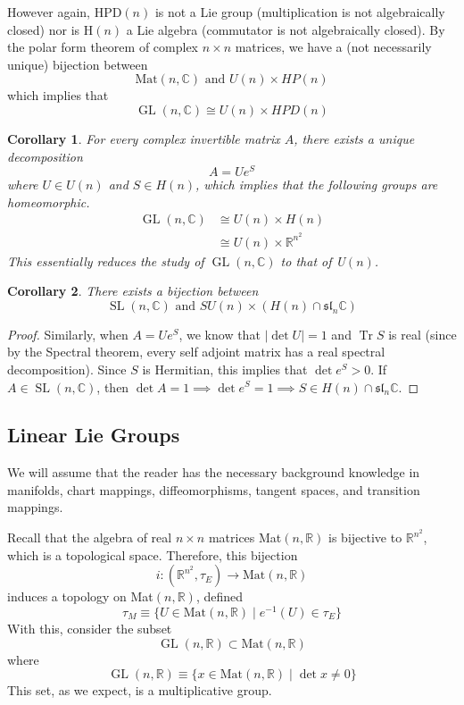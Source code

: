 \documentclass{article}
\DeclareMathOperator{\Tr}{Tr}
\DeclareMathOperator{\GL}{GL}
\DeclareMathOperator{\SL}{SL}
\newtheorem{corollary}{Corollary}[theorem]
\theoremstyle{remark}
\theoremstyle{definition}
\begin{document}
However again, HPD$(n)$ is not a Lie group (multiplication is not algebraically closed) nor is H$(n)$ a Lie algebra (commutator is not algebraically closed). By the polar form theorem of complex $n \times n$ matrices, we have a (not necessarily unique) bijection between
\[\text{Mat}(n, \mathbb{C}) \text{ and } U(n) \times HP(n)\]
which implies that
\[\GL(n, \mathbb{C}) \cong U(n) \times HPD (n)\]
\begin{corollary}
For every complex invertible matrix $A$, there exists a unique decomposition
\[A = U e^S \]
where $U \in U(n)$ and $S \in H(n)$, which implies that the following groups are homeomorphic. 
\begin{align*}
    \GL(n, \mathbb{C}) & \cong U(n) \times H(n) \\
    & \cong U(n) \times \mathbb{R}^{n^2}
\end{align*} 
This essentially reduces the study of $\GL(n, \mathbb{C})$ to that of U$(n)$. 
\end{corollary}

\begin{corollary}
There exists a bijection between 
\[\SL(n, \mathbb{C}) \text{ and } SU(n) \times (H(n) \cap \mathfrak{sl}_n \mathbb{C})\]
\end{corollary}
\begin{proof}
Similarly, when $A = U e^S$, we know that $|\det{U}| = 1$ and $\Tr{S}$ is real (since by the Spectral theorem, every self adjoint matrix has a real spectral decomposition). Since $S$ is Hermitian, this implies that $\det{e^S} > 0$. If $A \in \SL(n, \mathbb{C})$, then $\det{A} = 1 \implies \det{e^S} = 1 \implies S \in H(n) \cap \mathfrak{sl}_n \mathbb{C}$. 
\end{proof}

\subsection{Linear Lie Groups}
We will assume that the reader has the necessary background knowledge in manifolds, chart mappings, diffeomorphisms, tangent spaces, and transition mappings. 

Recall that the algebra of real $n \times n$ matrices Mat$(n, \mathbb{R})$ is bijective to $\mathbb{R}^{n^2}$, which is a topological space. Therefore, this bijection 
\[i:(\mathbb{R}^{n^2}, \tau_E) \longrightarrow \text{Mat}(n, \mathbb{R})\]
induces a topology on Mat$(n, \mathbb{R})$, defined 
\[\tau_M \equiv \{U \in \text{Mat}(n, \mathbb{R}) \; | \; e^{-1} (U) \in \tau_E\}\]
With this, consider the subset
\[\GL(n, \mathbb{R}) \subset \text{Mat}(n, \mathbb{R})\]
where
\[\GL(n, \mathbb{R}) \equiv \{x \in \text{Mat}(n, \mathbb{R}) \;|\; \det{x} \neq 0\}\]
This set, as we expect, is a multiplicative group. 
\end{document}

